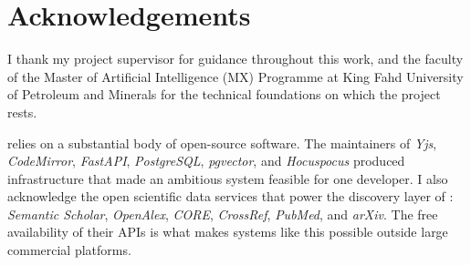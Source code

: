 \chapter*{Acknowledgements}

I thank my project supervisor for guidance throughout this work, and the faculty of the Master of Artificial Intelligence (MX) Programme at King Fahd University of Petroleum and Minerals for the technical foundations on which the project rests.

\sh{} relies on a substantial body of open-source software. The maintainers of \emph{Yjs}, \emph{CodeMirror}, \emph{FastAPI}, \emph{PostgreSQL}, \emph{pgvector}, and \emph{Hocuspocus} produced infrastructure that made an ambitious system feasible for one developer. I also acknowledge the open scientific data services that power the discovery layer of \sh{}: \emph{Semantic Scholar}, \emph{OpenAlex}, \emph{CORE}, \emph{CrossRef}, \emph{PubMed}, and \emph{arXiv}. The free availability of their APIs is what makes systems like this possible outside large commercial platforms.

\clearpage
